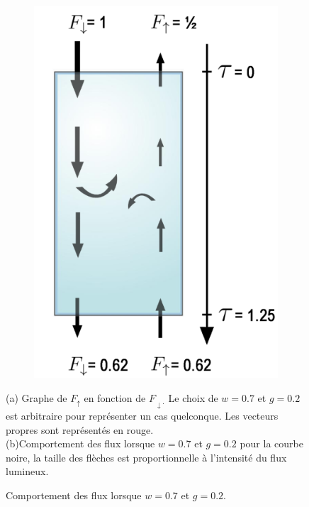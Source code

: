 \documentclass[12pt]{article}
\begin{document}
\begin{figure}[H]
\begin{subfigure}{0.32\textwidth}
        \includegraphics[width=1\textwidth]{Schema/G=0.2.png}
        \captionsetup{width=1.2\textwidth}
        \caption{} 
        \label{fig:Sub_Schema_W=0.7}
    \end{subfigure}
    \caption{Comportement des flux lorsque $w=0.7$ et $g=0.2$.}
    \label{fig:W=0.7}
    \justifying \noindent
    (a) Graphe de $F_{\uparrow}$ en fonction de $F_{\downarrow.}$ Le choix de $w=0.7$ et $g=0.2$ est arbitraire pour représenter un cas quelconque. Les vecteurs propres sont représentés en rouge.\\(b)Comportement des flux lorsque $w=0.7$ et $g=0.2$ pour la courbe noire, la taille des flèches est proportionnelle à l'intensité du flux lumineux.
\end{figure} %
\end{document}
